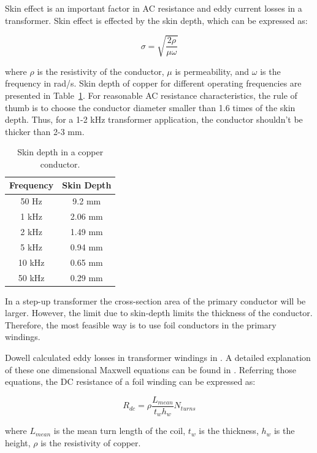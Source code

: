 \documentclass[a4paper, 11pt]{article} %
\begin{document}
Skin effect is an important factor in AC resistance and eddy current losses in a transformer. Skin effect is effected by the skin depth, which can be expressed as:

\begin{equation}
  \sigma = \sqrt{\frac{2\rho}{\mu \omega}}
\end{equation}

where $\rho$ is the resistivity of the conductor, $\mu$ is permeability, and $\omega$ is the frequency in rad/s. Skin depth of copper for different operating frequencies are presented in Table~\ref{skin-depth}. For reasonable AC resistance characteristics, the rule of thumb is to choose the conductor diameter smaller than 1.6 times of the skin depth. Thus, for a 1-2 kHz transformer application, the conductor shouldn't be thicker than 2-3 mm. 

\begin{table}[]
\begin{center}
\begin{tabular}{cc}
Frequency & Skin Depth \\
\hline
50 Hz & 9.2 mm \\
1 kHz & 2.06 mm \\
2 kHz & 1.49 mm \\
5 kHz & 0.94 mm \\
10 kHz & 0.65 mm \\
50 kHz & 0.29 mm \\
\hline
\end{tabular} 
\end{center}
\caption{Skin depth in a copper conductor.}
\label{skin-depth}
\end{table}

In a step-up transformer the cross-section area of the primary conductor will be larger. However, the limit due to skin-depth limits the thickness of the conductor. Therefore, the most feasible way is to use foil conductors in the primary windings.

Dowell calculated eddy losses in transformer windings in \cite{Dowell1966}. A detailed explanation of these one dimensional Maxwell equations can be found in \cite{Villar2010}. Referring those equations, the DC resistance of a foil winding can be expressed as:

\begin{equation}
  R_{dc} = \rho \frac{L_{mean}}{t_w h_w} N_{turns}
\end{equation}

where $L_{mean}$ is the mean turn length of the coil, $t_w$ is the thickness, $h_w$ is the height, $\rho$ is the resistivity of copper.
\end{document}
